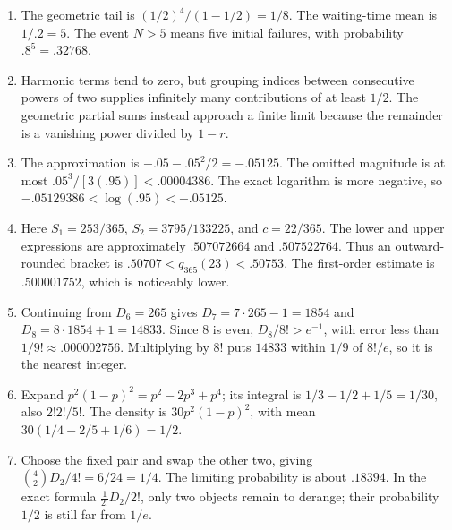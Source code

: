\begin{enumerate}
 contributions have infinite total.
 \item The geometric tail is $(1/2)^4/(1-1/2)=1/8$.
 The waiting-time mean is $1/.2=5$. The event $N>5$ means five
 initial failures, with probability $.8^5=.32768$.
 \item Harmonic terms tend to zero, but grouping indices between
 consecutive powers of two supplies infinitely many contributions
 of at least $1/2$. The geometric partial sums instead approach a
 finite limit because the remainder is a vanishing power divided
 by $1-r$.
 \item The approximation is $-.05-.05^2/2=-.05125$.
 The omitted magnitude is at most
 $.05^3/[3(.95)]<.00004386$. The exact logarithm is more negative,
 so $-.05129386<\log(.95)<-.05125$.
 \item Here $S_1=253/365$, $S_2=3795/133225$, and $c=22/365$.
 The lower and upper expressions are approximately $.507072664$
 and $.507522764$. Thus an outward-rounded bracket is
 $.50707<q_{365}(23)<.50753$. The first-order estimate is
 $.500001752$, which is noticeably lower.
 \item Continuing from $D_6=265$ gives $D_7=7\cdot265-1=1854$
 and $D_8=8\cdot1854+1=14833$.
 Since $8$ is even, $D_8/8!>e^{-1}$, with error less than
 $1/9!\approx.000002756$. Multiplying by $8!$ puts $14833$
 within $1/9$ of $8!/e$, so it is the nearest integer.
 \item Expand $p^2(1-p)^2=p^2-2p^3+p^4$; its integral is
 $1/3-1/2+1/5=1/30$, also $2!2!/5!$.
 The density is $30p^2(1-p)^2$, with mean
 $30(1/4-2/5+1/6)=1/2$.
 \item Choose the fixed pair and swap the other two, giving
 $\binom42D_2/4!=6/24=1/4$.
 The limiting probability is about $.18394$. In the exact formula
 $\frac1{2!}D_2/2!$, only two objects remain to derange; their
 probability $1/2$ is still far from $1/e$.
\end{enumerate}
